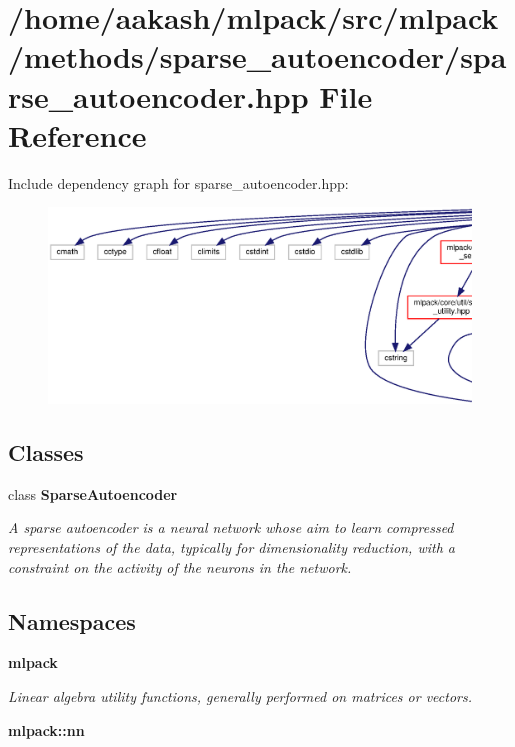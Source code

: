 \section{/home/aakash/mlpack/src/mlpack/methods/sparse\+\_\+autoencoder/sparse\+\_\+autoencoder.hpp File Reference}
\label{sparse__autoencoder_8hpp}
Include dependency graph for sparse\+\_\+autoencoder.\+hpp\+:
\nopagebreak
\begin{figure}[H]
\begin{center}
\leavevmode
\includegraphics[width=350pt]{sparse__autoencoder_8hpp__incl}
\end{center}
\end{figure}
\subsection*{Classes}
\begin{DoxyCompactItemize}
\item 
class \textbf{ Sparse\+Autoencoder}
\begin{DoxyCompactList}\small\item\em A sparse autoencoder is a neural network whose aim to learn compressed representations of the data, typically for dimensionality reduction, with a constraint on the activity of the neurons in the network. \end{DoxyCompactList}\end{DoxyCompactItemize}
\subsection*{Namespaces}
\begin{DoxyCompactItemize}
\item 
 \textbf{ mlpack}
\begin{DoxyCompactList}\small\item\em Linear algebra utility functions, generally performed on matrices or vectors. \end{DoxyCompactList}\item 
 \textbf{ mlpack\+::nn}
\end{DoxyCompactItemize}


